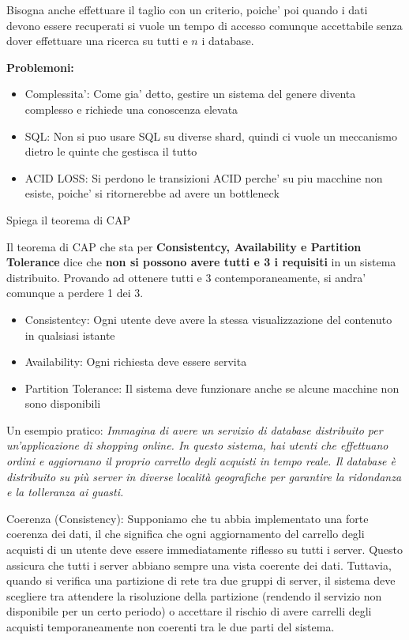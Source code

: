 Bisogna anche effettuare il taglio con un criterio, poiche' poi quando i dati
devono essere recuperati si vuole un tempo di accesso comunque accettabile
senza dover effettuare una ricerca su tutti e $n$ i database.

\textbf{Problemoni:}
\begin{itemize}
    \item Complessita': Come gia' detto, gestire un sistema del genere diventa complesso
          e richiede una conoscenza elevata
    \item SQL: Non si puo usare SQL su diverse shard, quindi ci vuole un meccanismo
          dietro le quinte che gestisca il tutto
    \item ACID LOSS: Si perdono le transizioni ACID perche' su piu macchine non esiste,
          poiche' si ritornerebbe ad avere un bottleneck
\end{itemize}

\begin{domanda}
    Spiega il teorema di CAP
\end{domanda}

Il teorema di CAP che sta per \textbf{Consistentcy, Availability e Partition
    Tolerance} dice che \textbf{non si possono avere tutti e 3 i requisiti} in un
sistema distribuito. Provando ad ottenere tutti e 3 contemporaneamente, si
andra' comunque a perdere 1 dei 3.
\begin{itemize}
    \item Consistentcy: Ogni utente deve avere la stessa visualizzazione del contenuto in
          qualsiasi istante
    \item Availability: Ogni richiesta deve essere servita
    \item Partition Tolerance: Il sistema deve funzionare anche se alcune macchine non
          sono disponibili
\end{itemize}

Un esempio pratico: \textit{Immagina di avere un servizio di database
    distribuito per un'applicazione di shopping online. In questo sistema, hai
    utenti che effettuano ordini e aggiornano il proprio carrello degli acquisti in
    tempo reale. Il database è distribuito su più server in diverse località
    geografiche per garantire la ridondanza e la tolleranza ai guasti.}

Coerenza (Consistency): Supponiamo che tu abbia implementato una forte coerenza
dei dati, il che significa che ogni aggiornamento del carrello degli acquisti
di un utente deve essere immediatamente riflesso su tutti i server. Questo
assicura che tutti i server abbiano sempre una vista coerente dei dati.
Tuttavia, quando si verifica una partizione di rete tra due gruppi di server,
il sistema deve scegliere tra attendere la risoluzione della partizione
(rendendo il servizio non disponibile per un certo periodo) o accettare il
rischio di avere carrelli degli acquisti temporaneamente non coerenti tra le
due parti del sistema.


